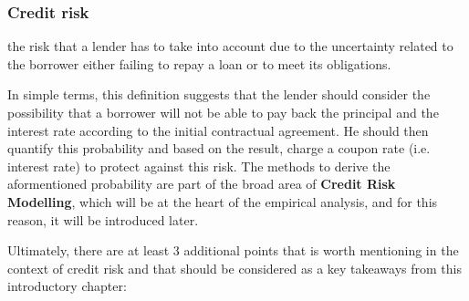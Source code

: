 \documentclass[a4paper,12pt]{article}
\begin{document}
    \subsubsection{Credit risk}

        \begin{definition}
            the risk that a lender has to take into account due to the uncertainty related to the borrower either failing to repay a loan or to meet its obligations.
        \end{definition}

        In simple terms, this definition suggests that the lender should consider the possibility that a borrower will not be able to pay back the principal and the 
        interest rate according to the initial contractual agreement. He should then quantify this probability and based on the result, charge a coupon rate 
        (i.e. interest rate) to protect against this risk. The methods to derive the aformentioned probability are part of the broad area of \textbf{Credit Risk Modelling},
        which will be at the heart of the empirical analysis, and for this reason, it will be introduced later. 
        
        Ultimately, there are at least 3 additional points that is worth mentioning in the context of credit risk and that should be considered as a key takeaways from this introductory chapter: 
        
\end{document}
